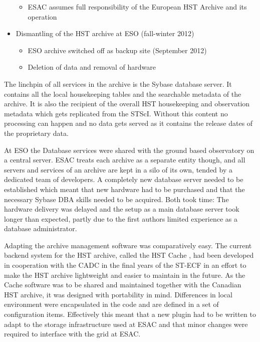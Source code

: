 \begin{itemize}
\begin{itemize}
\item ESAC assumes full responsibility of the European HST Archive and its operation
\end{itemize} \itemsep0pt \parskip0pt 
\item Dismantling of the HST archive at ESO (fall-winter 2012)
\begin{itemize} \itemsep0pt \parskip0pt 
\item ESO archive switched off as backup site (September 2012) 
\item Deletion of data and removal of hardware
\end{itemize}
\end{itemize}


The linchpin of all services in the archive is the Sybase database server. It contains all the local housekeeping tables and the searchable metadata of the archive. It is also the recipient of the overall HST housekeeping  and observation metadata which gets replicated from the STScI. Without this content no processing can happen and no data gets served as it contains the release dates of the proprietary data.
  
At ESO the Database services were shared with the ground based observatory on a central server. ESAC treats each archive as a separate entity though, and all servers and services of an archive are kept in a silo of its own, tended by a dedicated team of developers. A completely new database server needed to be established which meant that new hardware had to be purchased and that the necessary Sybase DBA skills needed to be acquired. Both took time: The hardware delivery was delayed and the setup as a main database server took longer than expected, partly due to the first authors limited experience as a database administrator.

Adapting the archive management software was comparatively easy. The current backend system for the HST archive, called the HST Cache \citep{2010ASPC..434..275H},  had been developed in cooperation with the CADC in the final years of the ST-ECF in an effort to make the HST archive lightweight and easier to maintain in the future. As the Cache software was to be shared and maintained together with the Canadian HST archive, it was designed with portability in mind. Differences in local environment were encapsulated in the code and are defined in a set of configuration items. Effectively this meant that a new plugin had to be written to adapt to the storage infrastructure used at ESAC and that minor changes were required to interface with the grid at ESAC. 


